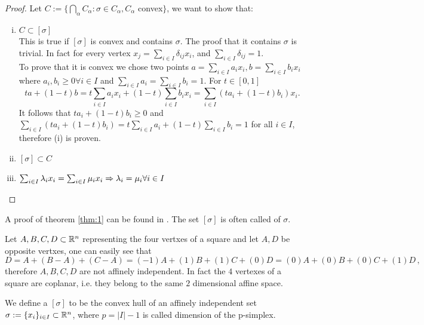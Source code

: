 \documentclass[../1.tex]{subfiles}
\begin{document}
    \begin{proof}
        Let $C := \{ \bigcap_\alpha C_\alpha : \sigma \in C_\alpha, C_\alpha$ convex$\}$, we want to show that:
        \begin{enumerate}[(i)]
            \item $C \subset [\sigma]$\\
            This is true if $[\sigma]$ is convex and contains $\sigma$.
            The proof that it contains $\sigma$ is trivial. In fact for every vertex $x_j = \sum_{i \in I} \delta_{ij} x_i$,
            and $\sum_{i \in I}\delta_{ij} = 1$.\\
            To prove that it is convex we chose two points $a = \sum_{i \in I} a_i x_i, b = \sum_{i \in I} b_i x_i$ where $a_i,b_i \geq 0 \forall i \in I$
            and $\sum_{i \in I} a_i = \sum_{i \in I} b_i = 1$. For $t \in [0,1]$
            \[ ta+(1-t)b = t\sum_{i \in I} a_i x_i + (1-t) \sum_{i \in I} b_i x_i = \sum_{i \in I} (ta_i + (1-t)b_i)x_i.\]
            It follows that $ta_i + (1-t)b_i \geq 0$ and $\sum_{i \in I} (ta_i + (1-t)b_i) = t\sum_{i \in I}a_i + (1-t)\sum_{i \in I}b_i = 1$ for all $i \in I$,
            therefore (i) is proven.

            \item $[\sigma] \subset C$
            \item $\sum_{i \in I} \lambda_i x_i = \sum_{i \in I} \mu_i x_i \Rightarrow \lambda_i = \mu_i \forall i \in I$
        \end{enumerate}
    \end{proof}

    A proof of theorem \ref{thm:1} can be found in \cite{singerthorpe}.
    The set $[\sigma]$ is often called  of $\sigma$.
    
    \begin{exa}
        Let ${A,B,C,D} \subset \mathbb{R}^n$ representing the four vertxes of a square and let $A,D$ be opposite vertxes, one can easily see that 
        \[ D = A + (B-A) + (C-A) = (-1)A + (1)B + (1)C + (0)D = (0)A + (0)B + (0)C + (1)D \, ,\]
        therefore $A,B,C,D$ are not affinely independent.
        In fact the $4$ vertexes of a square are coplanar, i.e. they belong to the same $2$ dimensional affine space.
    \end{exa}


    \begin{defn}
        We define a  $[\sigma]$ to be the convex hull of an affinely independent set $\sigma := \{x_i\}_{i \in I} \subset \mathbb{R}^n$,
        where $p = |I|-1$ is called dimension of the p-simplex. 
    \end{defn}
\end{document}
